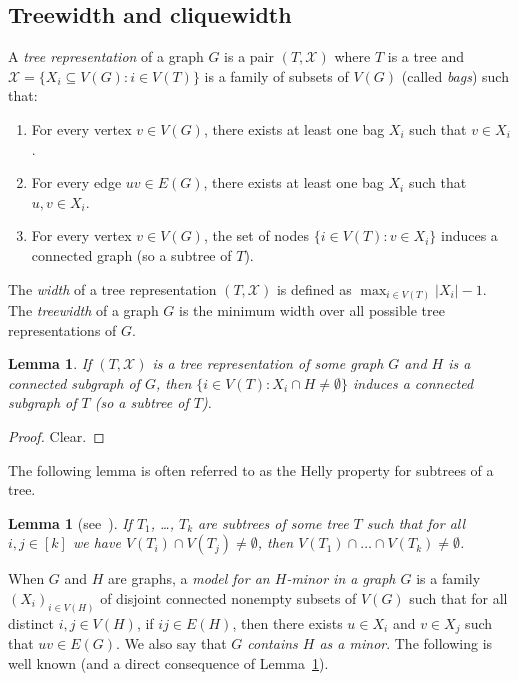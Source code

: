 \documentclass[11pt]{article}
\newtheorem{lemma}[theo]{Lemma}
\begin{document}
\subsection{Treewidth and cliquewidth}
\label{ssec:tw}


A \emph{tree representation} of a graph $G$ is a pair $(T, \mathcal{X})$ where $T$ is a tree and $\mathcal{X} = \{ X_i \subseteq V(G) : i \in V(T) \}$ is a family of subsets of $V(G)$ (called \emph{bags}) such that:
\begin{enumerate}
    \item\label{i:TWv} For every vertex $v \in V(G)$, there exists at least one bag $X_i$ such that $v \in X_i$.    
    \item\label{i:TWe} For every edge $uv \in E(G)$, there exists at least one bag $X_i$ such that $u, v \in  X_i$.
    \item\label{i:TWc} For every vertex $v \in V(G)$, the set of nodes $\{ i \in V(T) : v \in X_i \}$ induces a connected graph  (so a subtree of $T$).
\end{enumerate}

The \emph{width} of a tree representation $(T, \mathcal{X})$ is defined as $\max_{i \in V(T)} |X_i| - 1$.
The \emph{treewidth} of a graph  $G$ is the minimum width over all possible tree representations of  $G$.


\begin{lemma}
  \label{l:TWconnect}
  If $(T, \mathcal X)$ is a tree representation of some graph $G$ and $H$ is a connected subgraph of $G$, then $\{ i \in V(T) :  X_i \cap H \neq \emptyset \}$ induces a connected subgraph of $T$ (so a subtree of $T$).
\end{lemma}

\begin{proof}
  Clear. 
\end{proof}

The following lemma is often referred to as the Helly property for subtrees of a tree. 

\begin{lemma}[see~\cite{Gavril1974}]
  \label{l:helly}
  If $T_1$, \dots, $T_k$ are subtrees of some tree $T$ such that for all $i, j \in [k]$ we have $V(T_i) \cap V(T_j)\neq \emptyset$, then $V(T_1) \cap \dots \cap V(T_k) \neq \emptyset$. 
\end{lemma} 

When $G$ and $H$ are graphs, a \emph{model for an $H$-minor in a graph $G$} is a family $(X_i)_{i\in V(H)}$ of disjoint connected nonempty subsets of $V(G)$ such that for all distinct $i, j\in V(H)$, if $ij\in E(H)$, then there exists  $u\in X_i$ and $v\in X_j$ such that $uv\in E(G)$.  We also say that \emph{$G$ contains $H$ as a minor}. The following is well known (and a direct consequence of Lemma~\ref{l:helly}). 
\end{document}
